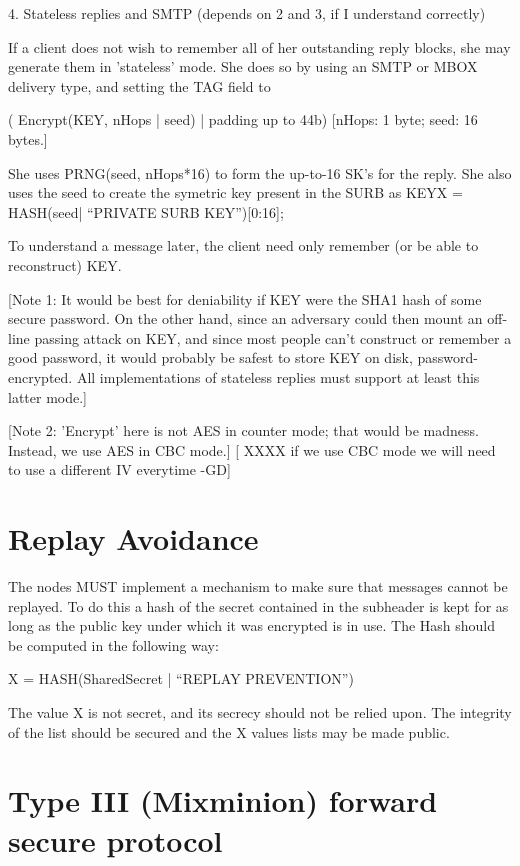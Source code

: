 4. Stateless replies and SMTP (depends on 2 and 3, if I understand correctly)

If a client does not wish to remember all of her outstanding
reply blocks, she may generate them in 'stateless' mode.  She  
does so by using an SMTP or MBOX delivery type, and setting
the TAG field to 

           ( Encrypt(KEY, nHops | seed) | padding up to 44b)
           [nHops: 1 byte; seed: 16 bytes.]

She uses PRNG(seed, nHops*16) to form the up-to-16 SK's for the reply.
She also uses the seed to create the symetric key present in the SURB
as KEYX = HASH(seed| ``PRIVATE SURB KEY'')[0:16];

To understand a message later, the client need only remember (or be
able to reconstruct) KEY.  

[Note 1: It would be best for deniability if KEY were the SHA1 hash of
some secure password.  On the other hand, since an adversary could
then mount an off-line passing attack on KEY, and since most people
can't construct or remember a good password, it would probably be
safest to store KEY on disk, password-encrypted.  All implementations
of stateless replies must support at least this latter mode.]

[Note 2: 'Encrypt' here is not AES in counter mode; that would be
madness.  Instead, we use AES in CBC mode.]
[ XXXX if we use CBC mode we will need to use a different IV everytime -GD]

\section{Replay Avoidance}

The nodes MUST implement a mechanism to make sure that messages cannot
be replayed. To do this a hash of the secret contained in the
subheader is kept for as long as the public key under which it was
encrypted is in use. The Hash should be computed in the following way:

X = HASH(SharedSecret | ``REPLAY PREVENTION'')

The value X is not secret, and its secrecy should not be relied upon.
The integrity of the list should be secured and the X values lists may
be made public.

\section{Type III (Mixminion) forward secure protocol}

